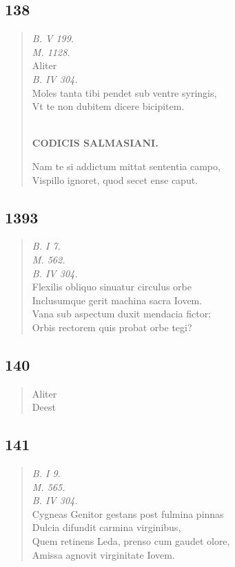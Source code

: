 \documentclass[11pt, a4paper]{report}
\begin{document}
            \subsection*{138}
      \begin{verse}
      \textit{B. V 199.} \\ \textit{M. 1128.} \\ Aliter \\ \textit{B. IV 304.} \\ Moles tanta tibi pendet sub ventre syringis, \\ Vt te non dubitem dicere bicipitem. \\ 
        ﻿\pagebreak 
     \marginpar{[141]} \begin{center} \textbf{CODICIS SALMASIANI.} \end{center}Nam te si addictum mittat sententia campo, \\ Vispillo ignoret, quod secet ense caput. \\ 
      \end{verse}
  
            \subsection*{1393}
      \begin{verse}
      \textit{B. I 7.} \\ \textit{M. 562.} \\ \textit{B. IV 304.} \\ Flexilis obliquo sinuatur circulus orbe \\ Inclusumque gerit machina sacra Iovem. \\ Vana sub aspectum duxit mendacia fictor: \\ Orbis rectorem quis probat orbe tegi? \\ 
      \end{verse}
  
            \subsection*{140}
      \begin{verse}
      Aliter \\ Deest \\ 
      \end{verse}
  
            \subsection*{141}
      \begin{verse}
      \textit{B. I 9.} \\ \textit{M. 565.} \\ \textit{B. IV 304.} \\ Cygneas Genitor gestans post fulmina pinnas \\ Dulcia difundit carmina virginibus, \\ Quem retinens Leda, prenso cum gaudet olore, \\ Amissa agnovit virginitate Iovem. \\ 
      \end{verse}
  
\end{document}
